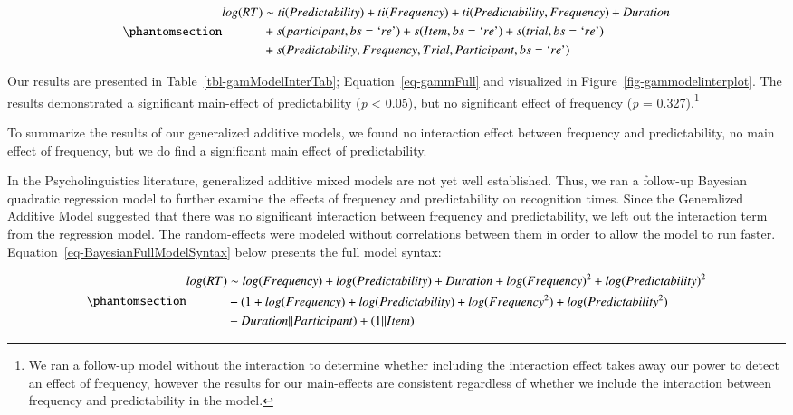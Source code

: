 \documentclass[
  authoryear,
  preprint,
  1p,
  onecolumn]{elsarticle}
\begin{document}
\begin{equation}\phantomsection\label{eq-gammFull}{
\begin{aligned}log(RT) & \sim ti(Predictability) + ti(Frequency) + ti(Predictability, Frequency) + Duration \\ & + s(participant, bs = \text{`}re\text{'}) + s(Item, bs = \text{`}re\text{'})  + s(trial, bs = \text{`}re\text{'}) \\ & + s(Predictability, Frequency, Trial, Participant, bs = \text{`}re\text{'}) \end{aligned}
}\end{equation}

Our results are presented in Table~\ref{tbl-gamModelInterTab};
Equation~\ref{eq-gammFull} and visualized in
Figure~\ref{fig-gammodelinterplot}. The results demonstrated a
significant main-effect of predictability (\emph{p} \textless{} 0.05),
but no significant effect of frequency (\emph{p} = 0.327).\footnote{We
  ran a follow-up model without the interaction to determine whether
  including the interaction effect takes away our power to detect an
  effect of frequency, however the results for our main-effects are
  consistent regardless of whether we include the interaction between
  frequency and predictability in the model.}

To summarize the results of our generalized additive models, we found no
interaction effect between frequency and predictability, no main effect
of frequency, but we do find a significant main effect of
predictability.

In the Psycholinguistics literature, generalized additive mixed models
are not yet well established. Thus, we ran a follow-up Bayesian
quadratic regression model to further examine the effects of frequency
and predictability on recognition times. Since the Generalized Additive
Model suggested that there was no significant interaction between
frequency and predictability, we left out the interaction term from the
regression model. The random-effects were modeled without correlations
between them in order to allow the model to run faster.
Equation~\ref{eq-BayesianFullModelSyntax} below presents the full model
syntax:

\begin{equation}\phantomsection\label{eq-BayesianFullModelSyntax}{
\begin{aligned}
log(RT) & \sim  log(Frequency) + log(Predictability) + Duration + log(Frequency)^2  + log(Predictability)^2 \\ & + (1 + log(Frequency) + log(Predictability) + log(Frequency^2) + log(Predictability^2) \\& + Duration || Participant) + (1 || Item)
\end{aligned}
}\end{equation}
\end{document}
